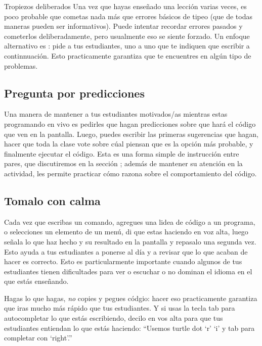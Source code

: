 \begin{aside}{Tropiezos deliberados}
  Una vez que hayas enseñado una lección varias veces,
  es poco probable que cometas nada más que errores básicos de tipeo
  (que de todas maneras pueden ser informativos).
  Puede intentar recordar errores pasados y cometerlos deliberadamente,
  pero usualmente eso se siente forzado.
  Un enfoque alternativo es :
  pide a tus estudiantes, uno a uno que te indiquen que escribir a continnuación.
  Esto practicamente garantiza que te encuentres en algún tipo de problemas.
\end{aside}

\subsection*{Pregunta por predicciones}

Una manera de mantener a tus estudiantes motivados/as mientras estas programando en vivo
es pedirles que hagan predicciones sobre que hará el código que ven en la pantalla.
Luego, puedes escribir las primeras sugerencias que hagan,
hacer que toda la clase vote sobre cúal piensan que es la opción más probable,
y finalmente ejecutar el código.
Esta es una forma simple de instrucción entre pares,
que discutiremos en la sección ;
además de mantener su atención en la actividad,
les permite practicar cómo razona sobre el comportamiento del código.

\subsection*{Tomalo con calma}

Cada vez que escribas un comando,
agregues una lidea de código a un programa,
o selecciones un elemento de un menú,
di que estas haciendo en voz alta,
luego señala lo que haz hecho y su resultado en la pantalla
y repasalo una segunda vez.
Esto ayuda a tus estudiantes a ponerse al día
y a revisar que lo que acaban de hacer es correcto.
Esto es particularmente importante cuando algunos de tus estudiantes tienen dificultades para ver o escuchar o no dominan el idioma en el que estás enseñando.

Hagas lo que hagas,
\emph{no} copies y pegues códgio:
hacer eso practicamente garantiza que iras mucho más rápido que tus estudiantes.
Y si usas la tecla tab para autocompletar lo que estás escribiendo,
decilo en vos alta para que tus estudiantes entiendan lo que estás haciendo:
``Usemos turtle dot `r' `i' y tab para completar con `right'.''

